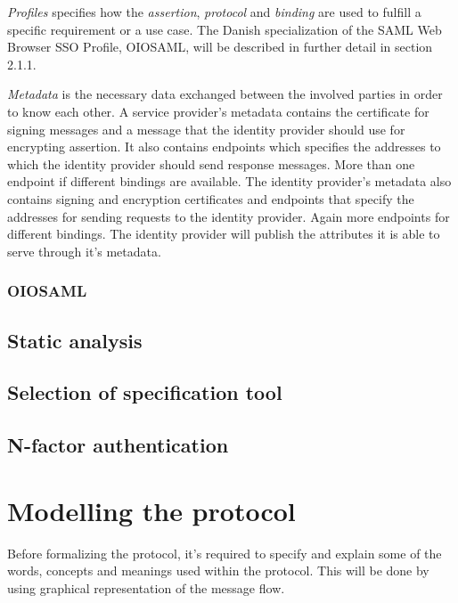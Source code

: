 \documentclass[twosided]{report}
\begin{document}
\par
\emph{Profiles} specifies how the \emph{assertion}, \emph{protocol} and \emph{binding} are used to fulfill a specific requirement or a use case. The Danish specialization of the SAML Web Browser SSO Profile, OIOSAML, will be described in further detail in section 2.1.1.
\par
\emph{Metadata} is the necessary data exchanged between the involved parties in order to know each other. A service provider's metadata contains the certificate for signing messages and a message that the identity provider should use for encrypting assertion. It also contains endpoints which specifies the addresses to which the identity provider should send response messages. More than one endpoint if different bindings are available. The identity provider's metadata also contains signing and encryption certificates and endpoints that specify the addresses for sending requests to the identity provider. Again more endpoints for different bindings. The identity provider will publish the attributes it is able to serve through it's metadata.

\subsection{OIOSAML}

\section{Static analysis}

\section{Selection of specification tool}


\section{N-factor authentication}
\label{sect:nfactauth}



\chapter{Modelling the protocol}
Before formalizing the protocol, it's required to specify and explain some of the words, concepts and meanings used within the protocol. This will be done by using graphical representation of the message flow.
\end{document}
